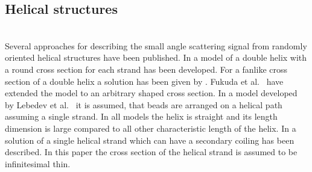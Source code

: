 \subsection{Helical structures} ~\\
Several approaches for describing the small angle scattering signal from randomly oriented helical structures have been published.
In \cite{Franklin1956,Puigjaner1974} a model of a double helix with a round cross section for each strand has been developed. For a fanlike cross section of a double helix a solution has been given by \cite{Schmidt1970,Pringle1971}. Fukuda et al.\ \cite{Fukuda2002} have extended the model to an arbitrary shaped cross section. In a model developed by Lebedev et al.\ \cite{Lebedev2003} it is assumed, that beads are arranged on a helical path assuming a single strand. In all models the helix is straight and its length dimension is large compared to all other characteristic length of the helix.
In \cite{Benham1980} a solution of a single helical strand which can have a secondary coiling has been described. In this paper the cross section of the helical strand is assumed to be infinitesimal thin.

~\\
